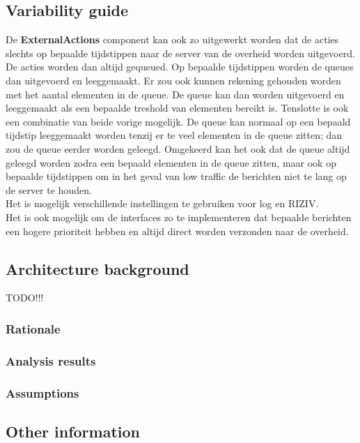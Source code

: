 \documentclass[a4paper,10pt]{book}
\begin{document}
\subsection{Variability guide}
De \textbf{ExternalActions} component kan ook zo uitgewerkt worden dat de acties slechts op bepaalde tijdstippen naar de server van de overheid worden uitgevoerd.  De acties worden dan altijd gequeued.  Op bepaalde tijdstippen worden de queues dan uitgevoerd en leeggemaakt.  Er zou ook kunnen rekening gehouden worden met het aantal elementen in de queue.  De queue kan dan worden uitgevoerd en leeggemaakt als een bepaalde treshold van elementen bereikt is.  Tenslotte is ook een combinatie van beide vorige mogelijk.  De queue kan normaal op een bepaald tijdstip leeggemaakt worden tenzij er te veel elementen in de queue zitten; dan zou de queue eerder worden geleegd.  Omgekeerd kan het ook dat de queue altijd geleegd worden zodra een bepaald elementen in de queue zitten, maar ook op bepaalde tijdstippen om in het geval van low traffic de berichten niet te lang op de server te houden.\\
Het is mogelijk verschillende instellingen te gebruiken voor log en RIZIV.\\
Het is ook mogelijk om de interfaces zo te implementeren dat bepaalde berichten een hogere prioriteit hebben en altijd direct worden verzonden naar de overheid.

\subsection{Architecture background}
TODO!!!

\subsubsection{Rationale}

\subsubsection{Analysis results}

\subsubsection{Assumptions}

\subsection{Other information}
\end{document}
